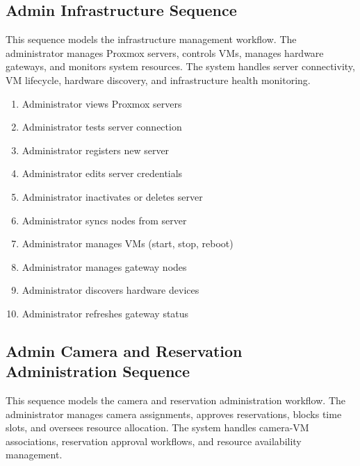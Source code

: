 
\subsection{Admin Infrastructure Sequence}
This sequence models the infrastructure management workflow. The administrator
manages Proxmox servers, controls VMs, manages hardware gateways, and monitors
system resources. The system handles server connectivity, VM lifecycle,
hardware discovery, and infrastructure health monitoring.

\begin{enumerate}[topsep=0pt,itemsep=1pt,parsep=0pt,partopsep=0pt]
    \item Administrator views Proxmox servers
    \item Administrator tests server connection
    \item Administrator registers new server
    \item Administrator edits server credentials
    \item Administrator inactivates or deletes server
    \item Administrator syncs nodes from server
    \item Administrator manages VMs (start, stop, reboot)
    \item Administrator manages gateway nodes
    \item Administrator discovers hardware devices
    \item Administrator refreshes gateway status
\end{enumerate}


\subsection{Admin Camera and Reservation Administration Sequence}
This sequence models the camera and reservation administration workflow. The
administrator manages camera assignments, approves reservations, blocks time
slots, and oversees resource allocation. The system handles camera-VM
associations, reservation approval workflows, and resource availability
management.

